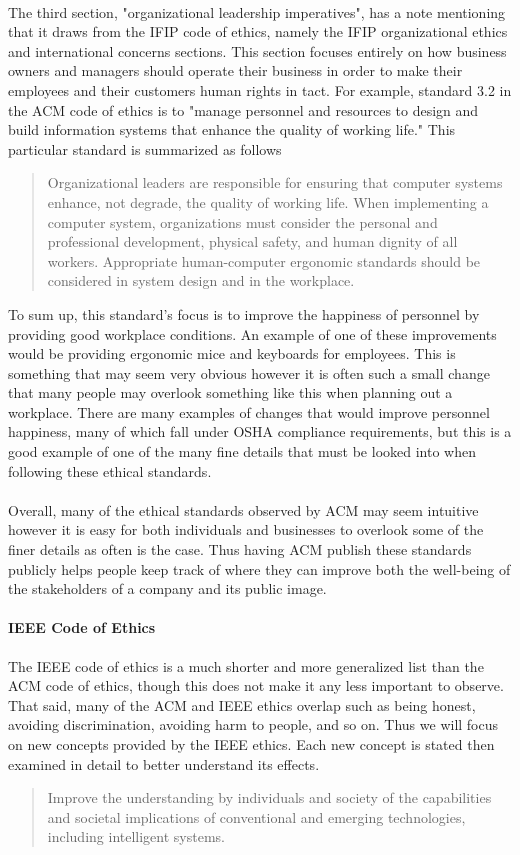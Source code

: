 \documentclass[notitlepage,a4paper,12pt]{article}
\begin{document}
\paragraph{}The third section, "organizational leadership imperatives", has a note mentioning that it draws from the IFIP code of ethics, namely the IFIP organizational ethics and international concerns sections. This section focuses entirely on how business owners and managers should operate their business in order to make their employees and their customers human rights in tact. For example, standard 3.2 in the ACM code of ethics is to "manage personnel and resources to design and build information systems that enhance the quality of working life." This particular standard is summarized as follows
	\begin{quote}
	Organizational leaders are responsible for ensuring that computer systems enhance, not degrade, the quality of working life. When implementing a computer system, organizations must consider the personal and professional development, physical safety, and human dignity of all workers. Appropriate human-computer ergonomic standards should be considered in system design and in the workplace.
	\end{quote}
To sum up, this standard's focus is to improve the happiness of personnel by providing good workplace conditions. An example of one of these improvements would be providing ergonomic mice and keyboards for employees. This is something that may seem very obvious however it is often such a small change that many people may overlook something like this when planning out a workplace. There are many examples of changes that would improve personnel happiness, many of which fall under OSHA compliance requirements, but this is a good example of one of the many fine details that must be looked into when following these ethical standards.
\paragraph{}Overall, many of the ethical standards observed by ACM may seem intuitive however it is easy for both individuals and businesses to overlook some of the finer details as often is the case. Thus having ACM publish these standards publicly helps people keep track of where they can improve both the well-being of the stakeholders of a company and its public image.
\paragraph{IEEE Code of Ethics}The IEEE code of ethics is a much shorter and more generalized list than the ACM code of ethics, though this does not make it any less important to observe. That said, many of the ACM and IEEE ethics overlap such as being honest, avoiding discrimination, avoiding harm to people, and so on. Thus we will focus on new concepts provided by the IEEE ethics. Each new concept is stated then examined in detail to better understand its effects.
	\begin{quote}
	Improve the understanding by individuals and society of the capabilities and societal implications of conventional and emerging technologies, including intelligent systems.
	\end{quote}
\end{document}
